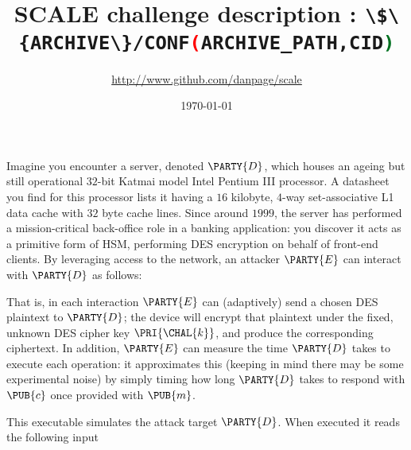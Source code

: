 \documentclass[crop={false},multi={true},tikz={true}]{standalone}
\begin{document}

\ifstandalone
\author{\url{http://www.github.com/danpage/scale}}
\title{\Large SCALE challenge description : \lstinline[language={bash}]|\$\{ARCHIVE\}/CONF(ARCHIVE_PATH,CID)|}
\date{\today}

\maketitle
\fi



Imagine you encounter a server, denoted $\PARTY{D}$, 
which houses an ageing but still operational $32$-bit Katmai model Intel 
Pentium III processor.  
A datasheet you find for this processor lists it having a $16$ kilobyte, 
$4$-way set-associative L1 data cache with $32$ byte cache lines.  Since
around $1999$, the server has performed a mission-critical back-office 
role in a banking application: you discover it acts as a primitive form 
of HSM, performing DES encryption on behalf of front-end clients.
By leveraging access to the network, 
an attacker $\PARTY{E}$ can interact with $\PARTY{D}$ as follows:

\begin{center}

\end{center}

\noindent
That is, in each interaction $\PARTY{E}$ can (adaptively) send 
a chosen DES  plaintext
to $\PARTY{D}$; the device will
encrypt that  plaintext under the fixed, unknown DES cipher key $\PRI{\CHAL{k}}$,
and produce 
the corresponding ciphertext.
In addition, $\PARTY{E}$ can measure the time $\PARTY{D}$ takes to execute 
each operation: it approximates this 
(keeping in mind there may be some experimental noise) 
by simply timing how long $\PARTY{D}$ takes to respond with $\PUB{c}$ once 
provided with $\PUB{m}$.




This executable simulates the attack target $\PARTY{D}$.  When executed it 
reads the following input
\end{document}
